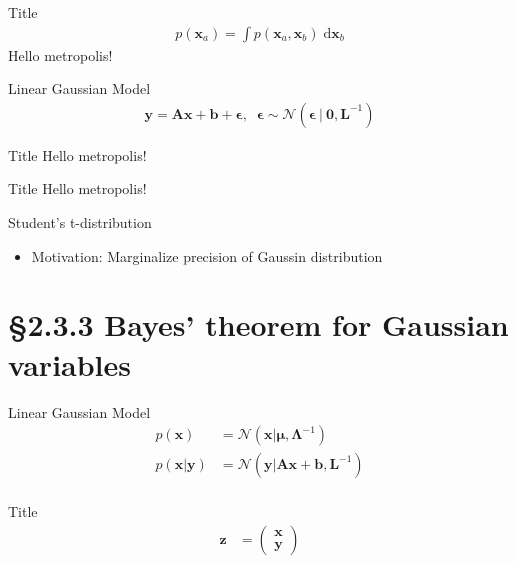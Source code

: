 \documentclass[10pt]{beamer}
\begin{document}
    \begin{frame}{Title}
        \begin{align*}
            p(\mathbf x_a) = \int p(\mathbf x_a, \mathbf x_b)\; \mathrm d\mathbf x_b
        \end{align*}
        Hello metropolis!
    \end{frame}
    \begin{frame}{Linear Gaussian Model}
        \begin{align*}
            \mathbf y = \mathbf A \mathbf x + \mathbf b + \bm \epsilon, \;\; \bm \epsilon \sim \mathcal N(\bm\epsilon\:|\: \mathbf 0, \mathbf L^{-1})
        \end{align*}
    \end{frame}
    \begin{frame}{Title}
        Hello metropolis!
    \end{frame}
    \begin{frame}{Title}
        Hello metropolis!
    \end{frame}
    \begin{frame}{Student's t-distribution}
        \begin{itemize}
            \item Motivation: Marginalize precision of Gaussin distribution
        \end{itemize}
    \end{frame}
    
    \section{\S2.3.3 Bayes' theorem for Gaussian variables}
    
    \begin{frame}{Linear Gaussian Model}
        \begin{align*}
            p(\mathbf x) &= \mathcal N(\mathbf x | \bm\mu, \bm\Lambda^{-1}) \tag{2.99} \\
            p(\mathbf x | \mathbf y) &= \mathcal N(\mathbf y | \mathbf A\mathbf x + \mathbf b, \mathbf L^{-1}) \tag{2.100} \\
        \end{align*}
    \end{frame}
    
    \begin{frame}{Title}
        \begin{align*}
            \mathbf z &= \begin{pmatrix}
                \mathbf x \\ \mathbf y
            \end{pmatrix} \tag{2.101}
        \end{align*}
    \end{frame}
    
\end{document}
